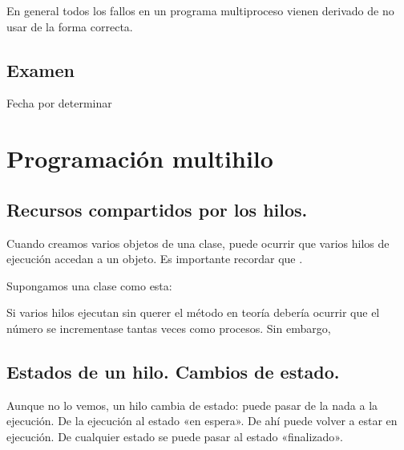 \documentclass[letterpaper,10pt,spanish]{sphinxmanual}
\begin{document}
En general todos los fallos en un programa multiproceso vienen derivado de no usar  de la forma correcta.


\section{Examen}
\label{\detokenize{textos/tema1:examen}}
Fecha por determinar


\chapter{Programación multihilo}
\label{\detokenize{textos/tema2:programacion-multihilo}}\label{\detokenize{textos/tema2::doc}}

\section{Recursos compartidos por los hilos.}
\label{\detokenize{textos/tema2:recursos-compartidos-por-los-hilos}}
Cuando creamos varios objetos de una clase, puede ocurrir que varios hilos de ejecución accedan a un objeto. Es importante recordar que .

Supongamos una clase como esta:

\begin{sphinxVerbatim}[commandchars=\\\{\}]
  
         
           
\end{sphinxVerbatim}

Si varios hilos ejecutan sin querer el método  en teoría debería ocurrir que el número se incrementase tantas veces como procesos. Sin embargo, 


\section{Estados de un hilo. Cambios de estado.}
\label{\detokenize{textos/tema2:estados-de-un-hilo-cambios-de-estado}}
Aunque no lo vemos, un hilo cambia de estado: puede pasar de la nada a la ejecución. De la ejecución al estado «en espera». De ahí puede volver a estar en ejecución. De cualquier estado se puede pasar al estado «finalizado».
\end{document}
